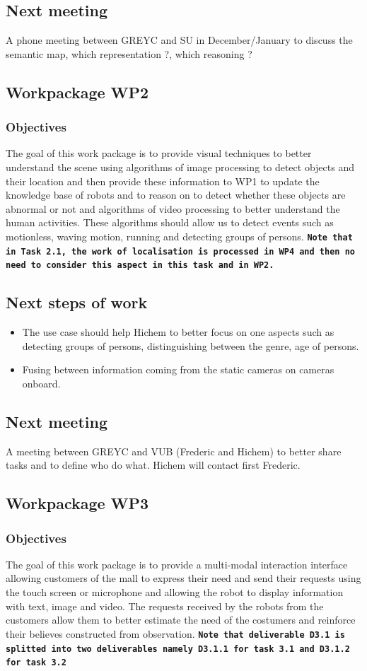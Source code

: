 \documentclass{article}
\begin{document}
\subsection*{Next meeting}
A phone meeting between GREYC and SU in December/January to discuss the semantic map, which representation ?, which reasoning ? 


\subsection{Workpackage WP2}
\subsubsection*{Objectives}
The goal of this work package is to provide visual techniques to better understand the scene using algorithms of image processing to detect objects and their location and then provide these information to WP1 to update the knowledge base of robots and to reason on to detect whether these objects are abnormal or not and algorithms of video processing to better understand the human activities. These algorithms should allow us to detect events such as motionless, waving motion, running and detecting groups of persons. 
{\bf\tt Note that in Task 2.1, the work of localisation is processed in WP4 and then no need to consider this aspect in this task and in WP2.}
\subsection*{Next steps of work}
\begin{itemize}
\item The use case should help Hichem to better focus on one aspects such as detecting groups of persons, distinguishing between the genre, age of persons. 
\item Fusing between information coming from the static cameras on cameras onboard. 
\end{itemize}
\subsection*{Next meeting}
A meeting between GREYC and VUB  (Frederic and Hichem) to better share  tasks and to define who do what. Hichem will contact first Frederic.
\subsection{Workpackage WP3}
\subsubsection*{Objectives}
The goal of this work package is to provide a multi-modal interaction interface allowing customers of the mall to express their need and send their requests using the touch screen or microphone and allowing the robot to display information with text, image and video. The requests received by the robots from the customers allow them to better estimate the need of the costumers and reinforce their believes constructed from observation.
{\bf\tt Note that deliverable D3.1 is splitted into two deliverables namely D3.1.1 for task 3.1 and D3.1.2 for task 3.2}
\end{document}
